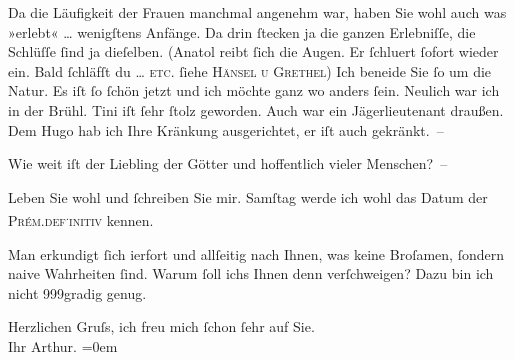 \pstart
           Da die Läufigkeit der Frauen manchmal angenehm war, haben Sie wohl auch was »erlebt«
                  {\dots} wenigſtens {\pb}Anfänge.
               Da drin ſtecken ja die ganzen Erlebniſſe, die Schlüſſe ſind ja dieſelben. (Anatol reibt ſich die Augen. Er
                  ſchlu{\geminationm}ert ſofort wieder ein. Bald ſchläfſt du {\dots}{ }\textsc{etc}. ſiehe \textsc{Hänsel u Grethel}) Ich beneide Sie ſo um die Natur. Es iſt ſo ſchön jetzt und ich möchte ganz wo
               anders ſein. Neulich war ich {\pb}in der Brühl. Tini iſt ſehr ſtolz geworden. Auch war ein Jägerlieutenant draußen. Dem Hugo hab ich Ihre Kränkung ausgerichtet, er iſt
               auch gekränkt. –\pend
           
\pstart
           Wie weit iſt der Liebling der Götter und
               hoffentlich vieler Menschen? – \pend
           
\pstart
           {\pb}Leben Sie wohl und ſchreiben Sie mir.
                  Samſtag werde ich wohl das Datum der \textsc{Prém.}\textsc{def}\substVorne{}\textsuperscript{.}\substDazwischen{}\textsc{initiv}\substHinten{} kennen.\pend
           
\pstart
           Man erkundigt ſich i{\geminationm}erfort und allſeitig nach Ihnen,
               was keine Broſamen, ſondern naive Wahrheiten {\pb}ſind.
               Warum ſoll ichs Ihnen denn verſchweigen? Dazu bin ich nicht 999gradig genug.\pend
           
\pstart
           Herzlichen Gruſs, ich freu mich ſchon ſehr auf Sie.{\\[\baselineskip]}Ihr
                  \spacefill\mbox{Arthur.}\pend
           \leftskip=0em{}\endnumbering{}  
      